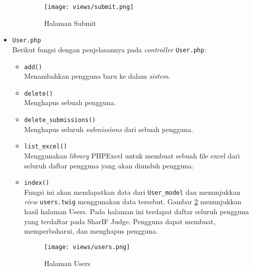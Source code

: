 \begin{itemize}
\begin{itemize}
		            \begin{figure}[H]
			            \centering
			            \texttt{[image: views/submit.png]}
			            \caption{Halaman Submit}
			            \label{fig:3:1:1:submit}
		            \end{figure}

	      \end{itemize}

	\item \verb|User.php| \\
	      Berikut fungsi dengan penjelasannya pada \textit{controller} \verb|User.php|:

	      \begin{itemize}
		      \item \verb|add()| \\
		            Menambahkan pengguna baru ke dalam \textit{sistem}.
		      \item \verb|delete()| \\
		            Menghapus sebuah pengguna.
		      \item \verb|delete_submissions()| \\
		            Menghapus seluruh \textit{submissions} dari sebuah pengguna.
		      \item \verb|list_excel()| \\
		            Menggunakan \textit{library} PHPExcel untuk membuat sebuah file excel dari seluruh daftar pengguna yang akan diunduh pengguna.
		      \item \verb|index()| \\
		            Fungsi ini akan mendapatkan data dari \verb|User_model| dan menunjukkan \textit{view} \verb|users.twig| menggunakan data tersebut. Gambar \ref{fig:3:1:1:users} menunjukkan hasil halaman Users. Pada halaman ini terdapat daftar seluruh pengguna yang terdaftar pada SharIF Judge. Pengguna dapat membuat, memperbaharui, dan menghapus pengguna.

		            \begin{figure}[H]
			            \centering
			            \texttt{[image: views/users.png]}
			            \caption{Halaman Users}
			            \label{fig:3:1:1:users}
		            \end{figure}


	      \end{itemize}

\end{itemize}

